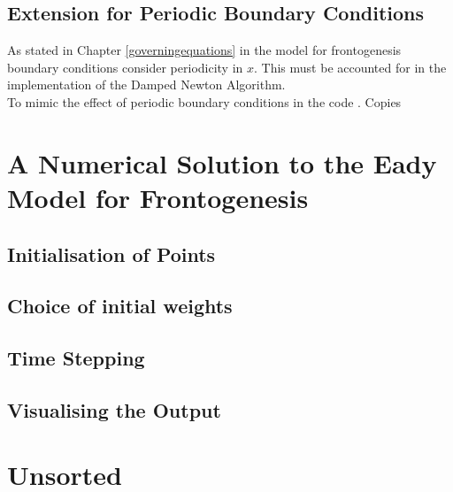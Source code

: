 \section{Extension for Periodic Boundary Conditions}
As stated in Chapter \ref{governingequations} in the model for frontogenesis boundary conditions consider periodicity in $x$. This must be accounted for in the implementation of the Damped Newton Algorithm.
\\
\linebreak
To mimic the effect of periodic boundary conditions in the code . Copies 
\chapter{A Numerical Solution to the Eady Model for Frontogenesis \label{algorithm}}
\section{Initialisation of Points}
\section{Choice of initial weights}
\section{Time Stepping}
\section{Visualising the Output}
\chapter{Unsorted}
